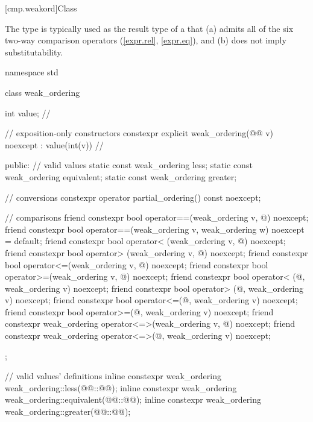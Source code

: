 [cmp.weakord]{Class }

\pnum
The  type is typically used
as the result type of a 
that (a) admits all of the six two-way comparison operators (\ref{expr.rel}, \ref{expr.eq}),
and (b) does not imply substitutability.

%
%
%
%
\begin{codeblock}
namespace std {
  class weak_ordering {
    int value;  // \expos

    // exposition-only constructors
    constexpr explicit weak_ordering(@@ v) noexcept : value(int(v)) {} // \expos

  public:
    // valid values
    static const weak_ordering less;
    static const weak_ordering equivalent;
    static const weak_ordering greater;

    // conversions
    constexpr operator partial_ordering() const noexcept;

    // comparisons
    friend constexpr bool operator==(weak_ordering v, @\unspec@) noexcept;
    friend constexpr bool operator==(weak_ordering v, weak_ordering w) noexcept = default;
    friend constexpr bool operator< (weak_ordering v, @\unspec@) noexcept;
    friend constexpr bool operator> (weak_ordering v, @\unspec@) noexcept;
    friend constexpr bool operator<=(weak_ordering v, @\unspec@) noexcept;
    friend constexpr bool operator>=(weak_ordering v, @\unspec@) noexcept;
    friend constexpr bool operator< (@\unspec@, weak_ordering v) noexcept;
    friend constexpr bool operator> (@\unspec@, weak_ordering v) noexcept;
    friend constexpr bool operator<=(@\unspec@, weak_ordering v) noexcept;
    friend constexpr bool operator>=(@\unspec@, weak_ordering v) noexcept;
    friend constexpr weak_ordering operator<=>(weak_ordering v, @\unspec@) noexcept;
    friend constexpr weak_ordering operator<=>(@\unspec@, weak_ordering v) noexcept;
  };

  // valid values' definitions
  inline constexpr weak_ordering weak_ordering::less(@@::@@);
  inline constexpr weak_ordering weak_ordering::equivalent(@@::@@);
  inline constexpr weak_ordering weak_ordering::greater(@@::@@);
}
\end{codeblock}


